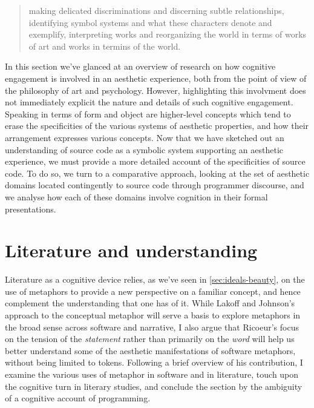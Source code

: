 \begin{quote}
    making delicated discriminations and discerning subtle relationships, identifying symbol systems and what these characters denote and exemplify, interpreting works and reorganizing the world in terms of works of art and works in termins of the world. \citep{goodman_languages_1976}
\end{quote}

\spacer

In this section we've glanced at an overview of research on how cognitive engagement is involved in an aesthetic experience, both from the point of view of the philosophy of art and psychology. However, highlighting this involvment does not immediately explicit the nature and details of such cognitive engagement. Speaking in terms of form and object are higher-level concepts which tend to erase the specificities of the various systems of aesthetic properties, and how their arrangement expresses various concepts. Now that we have sketched out an understanding of source code as a symbolic system supporting an aesthetic experience, we must provide a more detailed account of the specificities of source code. To do so, we turn to a comparative approach, looking at the set of aesthetic domains located contingently to source code through programmer discourse, and we analyse how each  of these domains involve cognition in their formal presentations.


\section{Literature and understanding}
\label{sec:aesthetic-literature}

Literature as a cognitive device relies, as we've seen in \ref{sec:ideals-beauty}, on the use of metaphors to provide a new perspective on a familiar concept, and hence complement the understanding that one has of it. While Lakoff and Johnson's approach to the conceptual metaphor will serve a basis to explore metaphors in the broad sense across software and narrative, I also argue that Ricoeur's focus on the tension of the \emph{statement} rather than primarily on the \emph{word} will help us better understand some of the aesthetic manifestations of software metaphors, without being limited to tokens. Following a brief overview of his contribution, I examine the various uses of metaphor in software and in literature, touch upon the cognitive turn in literary studies, and conclude the section by the ambiguity of a cognitive account of programming.

